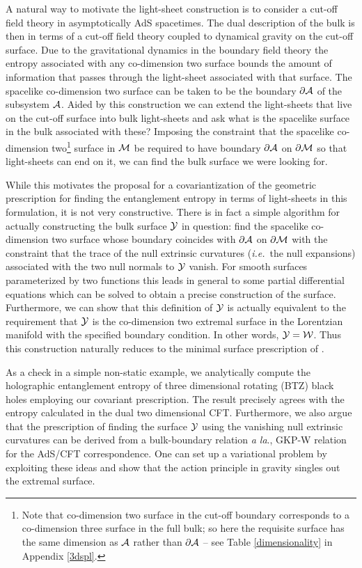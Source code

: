 \documentclass[12pt]{article}
\def\App#1{Appendix \ref{#1}}
\def\ie{{\it i.e.}}
\def\p{\partial}
\def\CA{{\cal A}}
\def\CW{{\cal W}}
\def\CY{{\cal Y}}
\def\p{\partial}
\def\p{\partial}
\def\bulk{{\cal M}}
\def\bdy{\p{\cal M}}
\def\Gms{\CW}
\def\Lms{\CY}
\def\rA{\CA}
\def\brA{\p \CA}
\begin{document}
A natural way to motivate the light-sheet construction is to consider a cut-off field theory in
 asymptotically AdS spacetimes. The dual description of the bulk is then in terms of a cut-off
 field theory coupled to dynamical gravity on the cut-off surface.  Due to the gravitational
 dynamics in the boundary field theory  the entropy associated with any co-dimension two surface
 bounds the amount of information that passes through the light-sheet associated with that surface.
 The spacelike co-dimension two surface can be taken to be the boundary $\brA$ of the subsystem $\rA$.
  Aided by this construction we can extend the light-sheets that live on the cut-off surface
  into bulk light-sheets and ask what is the spacelike surface in the bulk associated with these?
  Imposing the constraint that the spacelike co-dimension two\footnote{Note that co-dimension two
  surface in the cut-off boundary corresponds to a co-dimension three surface in the full bulk;
  so here the requisite surface has the same dimension
  as $\rA$ rather than $\brA$ -- see Table \ref{dimensionality} in \App{3dspl}. } surface in $\bulk$ be required to   have boundary $\brA$ on $\bdy$ so that light-sheets can end on
  it,  we can find  the bulk surface we were looking for.

While this motivates the proposal for a covariantization of the
geometric prescription for finding the entanglement entropy in terms
of light-sheets in this formulation, it is not very constructive.
There is in fact a simple algorithm for actually constructing the
bulk surface $\Lms$ in question: find the spacelike co-dimension two
surface whose boundary coincides with $\brA$ on $\bdy$ with the
constraint that the trace of the null extrinsic curvatures (\ie\ the
null expansions) associated with the two null normals to $\Lms$
vanish. For smooth surfaces parameterized by two functions this
leads in general to some partial differential equations which can be
solved to obtain a precise construction of the surface. Furthermore,
we can show that this definition of $\Lms$ is  actually equivalent
to the requirement that $\Lms$ is the co-dimension two extremal
surface  in the Lorentzian manifold with the specified boundary
condition. In other words, $\Lms = \Gms$. Thus this construction
naturally reduces to the minimal surface prescription of
\cite{Ryu:2006bv,Ryu:2006ef}.  

As a check in a simple non-static
example, we analytically compute the holographic entanglement
entropy of three dimensional rotating (BTZ) black holes employing
our covariant prescription. The result precisely agrees with the
entropy calculated in the dual two dimensional CFT.
 Furthermore, we also argue that the prescription of finding
the surface $\Lms$ using the vanishing null extrinsic curvatures can
be derived from a bulk-boundary relation {\it a la}., GKP-W relation
\cite{Gubser:1998bc, Witten:1998qj} for the AdS/CFT correspondence.
One can set up a variational problem by exploiting these ideas and
show that the action principle in gravity singles out the extremal
surface.
\end{document}
